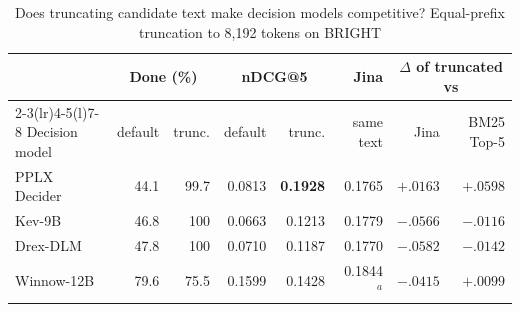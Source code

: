 \begin{table}[t]
\centering
\caption{Does truncating candidate text make decision models competitive? Equal-prefix truncation to 8,192 tokens on BRIGHT}\label{tab:budget}
\scriptsize\setlength{\tabcolsep}{3.2pt}
\begin{tabular}{@{}l rr rr r rr@{}}\toprule
 & \multicolumn{2}{c}{Done (\%)} & \multicolumn{2}{c}{nDCG@5} & Jina & \multicolumn{2}{c}{$\Delta$ of truncated vs}\\\cmidrule(lr){2-3}\cmidrule(lr){4-5}\cmidrule(l){7-8}
Decision model & default & trunc. & default & trunc. & same text & Jina & BM25 Top-5\\
\midrule
PPLX Decider & 44.1 & 99.7 & 0.0813 & \textbf{0.1928} & 0.1765 & $\mathbf{+.0163}$ & $\mathbf{+.0598}$\\
Kev-9B & 46.8 & 100 & 0.0663 & 0.1213 & 0.1779 & $-.0566$ & $-.0116$\\
Drex-DLM & 47.8 & 100 & 0.0710 & 0.1187 & 0.1770 & $-.0582$ & $-.0142$\\
Winnow-12B & 79.6 & 75.5 & 0.1599 & 0.1428 & 0.1844$^a$ & $-.0415$ & $+.0099$\\
\bottomrule\end{tabular}
\end{table}
